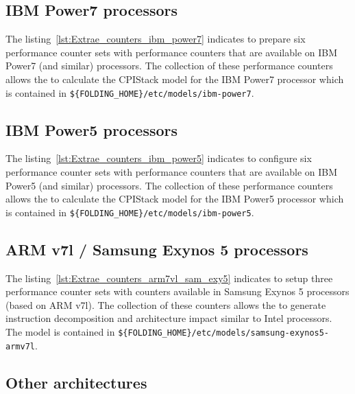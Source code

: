 \subsection{IBM Power7 processors}



The listing~\ref{lst:Extrae_counters_ibm_power7} indicates \EXTRAE to prepare six performance counter sets with performance counters that are available on IBM Power7 (and similar) processors.
The collection of these performance counters allows the \FOLDING to calculate the CPIStack model for the IBM Power7 processor which is contained in \texttt{\$\{FOLDING\_HOME\}/etc/models/ibm-power7}.

\subsection{IBM Power5 processors}



The listing~\ref{lst:Extrae_counters_ibm_power5} indicates \EXTRAE to configure six performance counter sets with performance counters that are available on IBM Power5 (and similar) processors.
The collection of these performance counters allows the \FOLDING to calculate the CPIStack model for the IBM Power5 processor which is contained in \texttt{\$\{FOLDING\_HOME\}/etc/models/ibm-power5}.

\subsection{ARM v7l / Samsung Exynos 5 processors}



The listing~\ref{lst:Extrae_counters_arm7vl_sam_exy5} indicates \EXTRAE to setup three performance counter sets with counters available in Samsung Exynos 5 processors (based on ARM v7l).
The collection of these counters allows the \FOLDING to generate instruction decomposition and architecture impact similar to Intel processors.
The model is contained in \texttt{\$\{FOLDING\_HOME\}/etc/models/samsung-exynos5-armv7l}.

\subsection{Other architectures}



